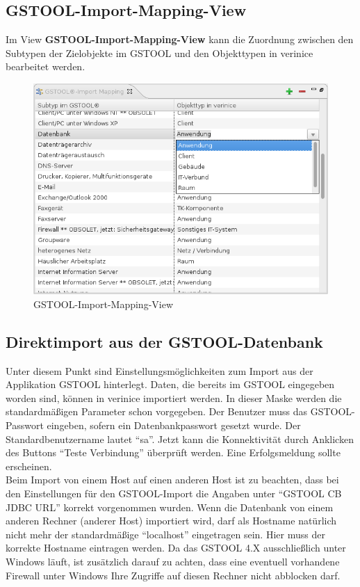 \documentclass[a4paper,10pt]{book}
\begin{document}
\subsection{GSTOOL-Import-Mapping-View}
Im View \textbf{GSTOOL-Import-Mapping-View} kann die Zuordnung zwischen den Subtypen der Zielobjekte im GSTOOL und den Objekttypen in verinice bearbeitet werden.
\begin{figure}[htb!]
  \centering
  \includegraphics[scale=.7]{Screenshot/gstool-import-mapping-view_de.png}
  \caption{\label{GSTOOL-Import-Mapping-View} GSTOOL-Import-Mapping-View}
\end{figure}

\subsection{Direktimport aus der GSTOOL-Datenbank}
Unter diesem Punkt sind Einstellungsmöglichkeiten zum Import aus der Applikation \textsc{GSTOOL} hinterlegt. Daten, die bereits im \textsc{GSTOOL}
eingegeben worden sind, können in verinice importiert werden. In dieser Maske werden die standardmäßigen Parameter schon vorgegeben.
Der Benutzer muss das \textsc{GSTOOL}-Passwort eingeben, sofern ein Datenbankpasswort gesetzt wurde. Der Standardbenutzername lautet ``sa''.
Jetzt kann die Konnektivität durch Anklicken des Buttons ``Teste Verbindung'' überprüft werden. Eine Erfolgsmeldung sollte erscheinen.
\newline\\
Beim Import von einem Host auf einen anderen Host ist zu beachten, dass bei den Einstellungen für den \textsc{GSTOOL}-Import die Angaben
unter ``\textsc{GSTOOL CB JDBC URL}'' korrekt vorgenommen wurden. Wenn die Datenbank von einem anderen Rechner (anderer Host) importiert wird,
darf als Hostname natürlich nicht mehr der standardmäßige ``localhost'' eingetragen sein. Hier muss der korrekte Hostname eintragen werden.
Da das \textsc{GSTOOL} 4.X ausschließlich unter Windows läuft, ist zusätzlich darauf zu achten, dass eine eventuell vorhandene Firewall unter Windows Ihre
Zugriffe auf diesen Rechner nicht abblocken darf.
\end{document}
